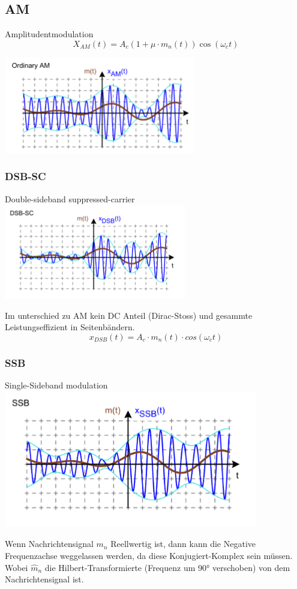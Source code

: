 \subsection{AM}
Amplitudentmodulation
\[
X_{AM}(t) = A_c (1 + \mu \cdot m_n(t))\cos(\omega_ct) \]

\includegraphics[width=0.5\columnwidth]{Images/am}

\subsubsection{DSB-SC}
Double-sideband suppressed-carrier\\

\includegraphics[width=0.5\columnwidth]{Images/dsb_sc}

Im unterschied zu AM kein DC Anteil (Dirac-Stoss) und gesammte Leistungseffizient in Seitenbändern.
\[x_{DSB}(t) = A_c \cdot m_n(t) \cdot cos(\omega_ct)\]

\subsubsection{SSB}
Single-Sideband modulation\\
\includegraphics[width=0.5\columnwidth]{Images/ssb}

Wenn Nachrichtensignal $m_n$ Reellwertig ist, dann kann die Negative Frequenzachse weggelassen werden, da diese Konjugiert-Komplex sein müssen. Wobei $\hat{m}_n$ die Hilbert-Transformierte (Frequenz um 90° verschoben) von dem Nachrichtensignal ist.

